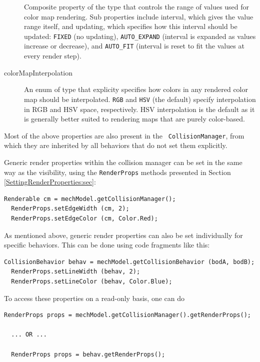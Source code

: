 \begin{description}
Composite property of the type
 that controls the range
of values used for color map rendering. Sub properties include {\sf
interval}, which gives the value range itself, and {\sf updating},
which specifies how this interval should be updated: {\tt FIXED} (no
updating), {\tt AUTO\_EXPAND} (interval is expanded as values increase
or decrease), and {\tt AUTO\_FIT} (interval is reset to fit the values
at every render step).

\item[colorMapInterpolation]\mbox{}

An enum of type
 that explicity
specifies how colors in any rendered color map should be interpolated.
{\tt RGB} and {\tt HSV} (the default) specify interpolation in RGB and
HSV space, respectively. HSV interpolation is the default as it is
generally better suited to rendering maps that are purely color-based.

\end{description}

Most of the above properties are also present in the {\tt
CollisionManager}, from which they are inherited by all behaviors that
do not set them explicitly.

Generic render properties within the collision manager can be
set in the same way as the visibility, using the {\tt RenderProps}
methods presented in Section \ref{SettingRenderProperties:sec}:
\begin{lstlisting}[]
  Renderable cm = mechModel.getCollisionManager();
  RenderProps.setEdgeWidth (cm, 2);
  RenderProps.setEdgeColor (cm, Color.Red);
\end{lstlisting}

As mentioned above, generic render properties can also be set
individually for specific behaviors. This can be done using code
fragments like this:
\begin{lstlisting}[]
  CollisionBehavior behav = mechModel.getCollisionBehavior (bodA, bodB);
  RenderProps.setLineWidth (behav, 2);
  RenderProps.setLineColor (behav, Color.Blue);
\end{lstlisting}
To access these properties on a read-only basis, one can do
\begin{lstlisting}[]
  RenderProps props = mechModel.getCollisionManager().getRenderProps();

  ... OR ...

  RenderProps props = behav.getRenderProps();
\end{lstlisting}

